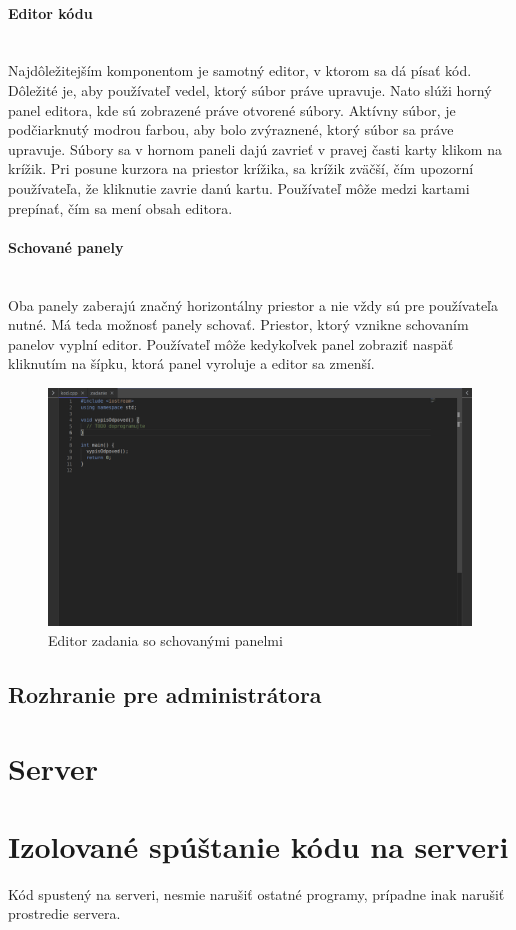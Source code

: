 \paragraph{Editor kódu}\leavevmode\\
Najdôležitejším komponentom je samotný editor, v ktorom sa dá písať kód. Dôležité je, aby používateľ
vedel, ktorý súbor práve upravuje. Nato slúži horný panel editora, kde sú zobrazené práve otvorené
súbory. Aktívny súbor, je podčiarknutý modrou farbou, aby bolo zvýraznené, ktorý súbor sa práve
upravuje. Súbory sa v hornom paneli dajú zavrieť v pravej časti karty klikom na krížik. Pri
posune kurzora na priestor krížika, sa krížik zväčší, čím upozorní používateľa, že kliknutie zavrie
danú kartu. Používateľ môže medzi kartami prepínať, čím sa mení obsah editora.

\paragraph{Schované panely}\leavevmode\\
Oba panely zaberajú značný horizontálny priestor a nie vždy sú pre používateľa nutné. Má teda
možnosť panely schovať. Priestor, ktorý vznikne schovaním panelov vyplní editor. Používateľ môže
kedykoľvek panel zobraziť naspäť kliknutím na šípku, ktorá panel vyroluje a editor sa zmenší. 
\begin{figure}[H]
\centerline{\includegraphics[width=1\textwidth]{images/zcucnute_panely}}
\caption[Editor zadania so schovanými panelmi]{Editor zadania so schovanými panelmi}
\label{obr:zcucnute_panely}
\end{figure}

\subsection{Rozhranie pre administrátora}

\section{Server}

\section{Izolované spúštanie kódu na serveri}
\label{kap:isolated_env} %

Kód spustený na serveri, nesmie narušiť ostatné programy, prípadne inak narušiť prostredie servera.
